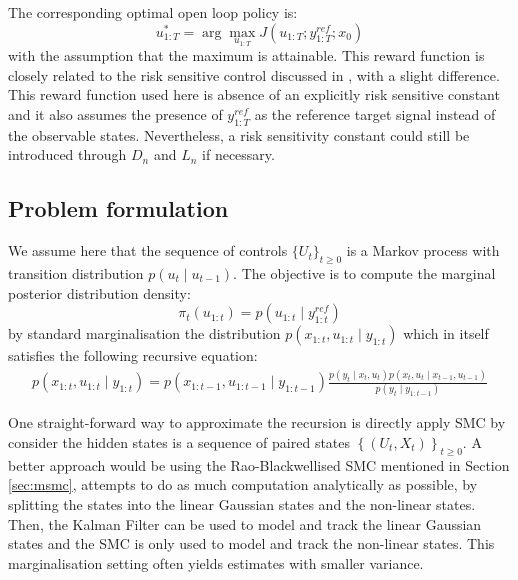 The corresponding optimal open loop policy is:
\begin{equation}
  u^*_{1:T} = \arg\max_{u_{1:T}} J(u_{1:T};y^{ref}_{1:T};x_0)
\label{eq:optcontrol}
\end{equation}
with the assumption that the maximum is attainable. This reward function is closely related to the risk sensitive control discussed in \cite{WR90}, with a slight difference. This reward function used here is absence of an explicitly risk sensitive constant and it also assumes the presence of $y^{ref}_{1:T}$ as the reference target signal instead of the observable states. Nevertheless, a risk sensitivity constant could still be introduced through $D_n$ and $L_n$ if necessary.

\subsection{Problem formulation}
We assume here that the sequence of controls $\{U_t\}_{t \geq 0}$ is a Markov process with transition distribution $p(u_t \mid u_{t-1})$. The objective is to compute the marginal posterior distribution density:
\begin{equation}
 \pi_t(u_{1:t}) = p(u_{1:t} \mid y^{ref}_{1:t})
\end{equation} 
by standard marginalisation the distribution $p(x_{1:t}, u_{1:t} \mid y_{1:t})$ which in itself satisfies the following recursive equation:
\begin{align}
  p(x_{1:t}, u_{1:t} \mid y_{1:t}) = p(x_{1:t-1}, u_{1:t-1} \mid y_{1:t-1}) \frac{p(y_t \mid x_t, u_t)p(x_t, u_t \mid x_{t-1}, u_{t-1})}{p(y_t \mid y_{1:t-1})}
\end{align}
 
One straight-forward way to approximate the recursion is directly apply SMC by consider the hidden states is a sequence of paired states $\left\{(U_t, X_t)\right\}_{t \geq 0}$. A better approach would be using the Rao-Blackwellised SMC mentioned in Section \ref{sec:msmc}, attempts to do as much computation analytically as possible, by splitting the states into the linear Gaussian states and the non-linear states. Then, the Kalman Filter can be used to model and track the linear Gaussian states and the SMC is only used to model and track the non-linear states. This marginalisation setting often yields estimates with smaller variance.

